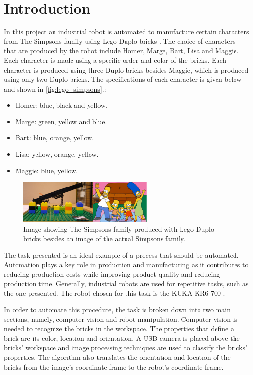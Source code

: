 \chapter{Introduction}\label{chap:introduction}
In this project an industrial robot is automated to manufacture certain characters from The Simpsons family using Lego Duplo bricks \cite{duplo}. The choice of characters that are produced by the robot include Homer, Marge, Bart, Lisa and Maggie. Each character is made using a specific order and color of the bricks. Each character is produced using three Duplo bricks besides Maggie, which is produced using only two Duplo bricks. The specifications of each character is given below and shown in \autoref{fig:lego_simpsons}.:

\begin{itemize}
	\item Homer: blue, black and yellow.
	\item Marge: green, yellow and blue.
	\item Bart: blue, orange, yellow.
	\item Lisa: yellow, orange, yellow.
	\item Maggie: blue, yellow.
\end{itemize}

\begin{figure}[H]
    \includegraphics[width=0.6\textwidth]{figures/lego_simpsons.pdf}
    \caption{Image showing The Simpsons family produced with Lego Duplo bricks besides an image of the actual Simpsons family.}
    \label{fig:lego_simpsons}
\end{figure}

The task presented is an ideal example of a process that should be automated. Automation plays a key role in production and manufacturing as it contributes to reducing production costs while improving product quality and reducing production time. Generally, industrial robots are used for repetitive tasks, such as the one presented. The robot chosen for this task is the KUKA KR6 700 \cite{kuka}.

In order to automate this procedure, the task is broken down into two main sections, namely, computer vision and robot manipulation. Computer vision is needed to recognize the bricks in the workspace. The properties that define a brick are its color, location and orientation. A USB camera is placed above the bricks' workspace and image processing techniques are used to classify the bricks' properties. The algorithm also translates the orientation and location of the bricks from the image's coordinate frame to the robot's coordinate frame.

